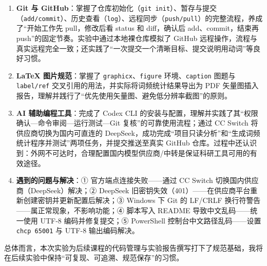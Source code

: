 \documentclass{SYSUReport}
\begin{document}
\begin{enumerate}
    \item \textbf{Git 与 GitHub}：掌握了仓库初始化（\texttt{git init}）、暂存与提交（\texttt{add/commit}）、历史查看（\texttt{log}）、远程同步（\texttt{push/pull}）的完整流程，养成了“开始工作先 pull，修改后看 status 和 diff，确认后 add、commit，结束再 push”的固定节奏。实验中通过本地裸仓库模拟了 GitHub 远程操作，流程与真实远程完全一致；还实践了“一次提交一个清晰目标、提交说明用动词”等良好习惯。
    \item \textbf{LaTeX 图片规范}：掌握了 \texttt{graphicx}、\texttt{figure} 环境、\texttt{caption} 图题与 \texttt{label/ref} 交叉引用的用法，并实际将词频统计结果导出为 PDF 矢量图插入报告，理解并践行了“优先使用矢量图、避免低分辨率截图”的原则。
    \item \textbf{AI 辅助编程工具}：完成了 Codex CLI 的安装与配置，理解并实践了其“权限确认—命令审阅—运行测试—Git 复核”的可靠使用流程；通过 CC Switch 将供应商切换为国内可直连的 DeepSeek，成功完成“项目只读分析”和“生成词频统计程序并测试”两项任务，并提交推送至真实 GitHub 仓库。过程中还认识到：外网不可达时，合理配置国内模型供应商/中转是保证科研工具可用的有效途径。
    \item \textbf{遇到的问题与解决}：① 官方端点连接失败——通过 CC Switch 切换国内供应商（DeepSeek）解决；② DeepSeek 旧密钥失效（401）——在供应商平台重新创建密钥并更新配置后解决；③ Windows 下 Git 的 LF/CRLF 换行符警告——属正常现象，不影响功能；④ 脚本写入 README 导致中文乱码——统一使用 UTF-8 编码并修复提交；⑤ PowerShell 控制台中文路径乱码——设置 \texttt{chcp 65001} 与 UTF-8 输出编码解决。
\end{enumerate}

总体而言，本次实验为后续课程的代码管理与实验报告撰写打下了规范基础，我将在后续实验中保持“可复现、可追溯、规范保存”的习惯。
\end{document}
